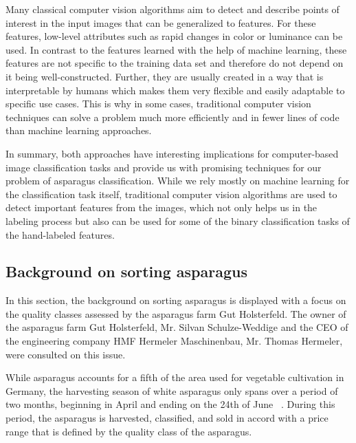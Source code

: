 Many classical computer vision algorithms aim to detect and describe points of interest in the input images that can be generalized to features. For these features, low-level attributes such as rapid changes in color or luminance can be used. In contrast to the features learned with the help of machine learning, these features are not specific to the training data set and therefore do not depend on it being well-constructed. Further, they are usually created in a way that is interpretable by humans which makes them very flexible and easily adaptable to specific use cases. This is why in some cases, traditional computer vision techniques can solve a problem much more efficiently and in fewer lines of code than machine learning approaches.

\bigskip
In summary, both approaches have interesting implications for computer-based image classification tasks and provide us with promising techniques for our problem of asparagus classification. While we rely mostly on machine learning for the classification task itself, traditional computer vision algorithms are used to detect important features from the images, which not only helps us in the labeling process but also can be used for some of the binary classification tasks of the hand-labeled features.


\subsection{Background on sorting asparagus}
\label{sec:BackgroundSortingAsparagus}

In this section, the background on sorting asparagus is displayed with a focus on the  quality classes assessed by the asparagus farm Gut Holsterfeld. The owner of the asparagus farm Gut Holsterfeld, Mr. Silvan Schulze-Weddige and the CEO of the engineering company HMF Hermeler Maschinenbau, Mr. Thomas Hermeler, were consulted on this issue.

\bigskip
While asparagus accounts for a fifth of the area used for vegetable cultivation in Germany, the harvesting season of white asparagus only spans over a period of two months, beginning in April and ending on the 24th of June ~\citep{spargelstatistik,nrw2018spargel}. During this period, the asparagus is harvested, classified, and sold in accord with a price range that is defined by the quality class of the asparagus.

